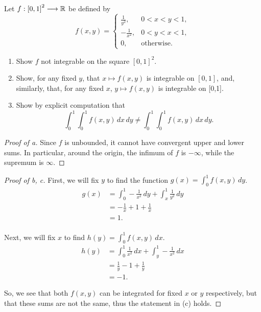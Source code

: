 \documentclass[../hw7]{subfiles}
\begin{document}
\begin{problem}[3]
Let $f : {[0,1]}^2 \longrightarrow \mathbb{R}$ be defined by \[
	f(x,y) = \begin{cases}
		\frac{1}{y^2},  & 0<x<y<1,          \\
		-\frac{1}{x^2}, & 0<y<x<1,          \\
		0,              & \text{otherwise}.
	\end{cases}
\]
\begin{enumerate}[label=(\alph*)]
	\item Show $f$ not integrable on the square  ${[0,1]}^2$.
	\item Show, for any fixed $y$, that  $x \mapsto f(x,y)$ is integrable on $[0,1]$,
	      and, similarly, that, for any fixed  $x$,  $y\mapsto f(x,y)$ is integrable on [0,1].
	\item Show by explicit computation that \[
		      \int_{0}^{1} \int_{0}^{1} f(x,y) \,dx \,dy \neq \int_{0}^{1} \int_{0}^{1} f(x,y) \,dx \,dy
		      .\]
\end{enumerate}
\end{problem}
\begin{proof}[Proof of a]
	Since $f$ is unbounded, it cannot have convergent upper and lower sums.
	In particular, around the origin, the infimum of $f$ is  $-\infty$, while the supremum is $\infty$.
\end{proof}
\begin{proof}[Proof of b, c]
	First, we will fix $y$ to find the function $g(x)=\int_{0}^{1} f(x,y) \,dy$.
	\begin{align*}
		g(x) & =\int_{0}^{1} -\frac{1}{x^2} \,dy + \int_{x}^{1} \frac{1}{y^2} \,dy \\
		     & = -\frac{1}{x} + 1 + \frac{1}{x}                                    \\
		     & = 1.                                                                \\
	\end{align*}

	Next, we will fix $x$ to find $h(y)=\int_{0}^{1} f(x,y) \,dx$.
	\begin{align*}
		h(y) & = \int_{0}^{1} \frac{1}{x^2} \,dx + \int_{y}^{1} -\frac{1}{x^2} \,dx \\
		     & = \frac{1}{y} - 1 + \frac{1}{y}                                      \\
		     & = -1.
	\end{align*}

	So, we see that both  $f(x,y)$ can be integrated for fixed  $x$ or  $y$ respectively, but that these sums are not the same, thus  the statement in (c) holds.
\end{proof}
\end{document}
